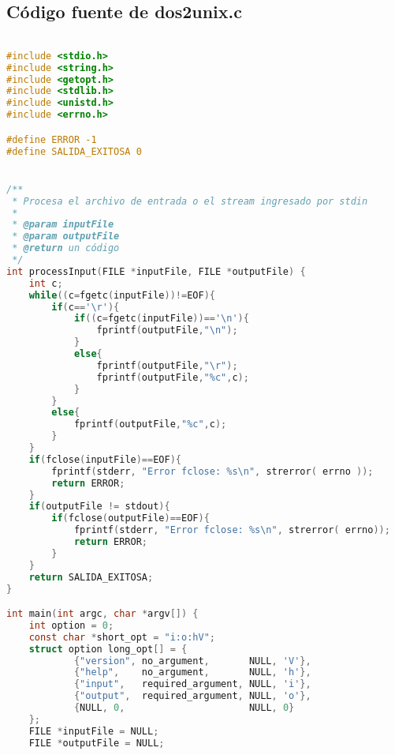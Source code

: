 \documentclass[a4paper]{article}
\begin{document}
\subsection{Código fuente de dos2unix.c}
\begin{lstlisting}[language=C]

#include <stdio.h>
#include <string.h>
#include <getopt.h>
#include <stdlib.h>
#include <unistd.h>
#include <errno.h>

#define ERROR -1
#define SALIDA_EXITOSA 0


/**
 * Procesa el archivo de entrada o el stream ingresado por stdin
 *
 * @param inputFile
 * @param outputFile
 * @return un código
 */
int processInput(FILE *inputFile, FILE *outputFile) {
    int c;
    while((c=fgetc(inputFile))!=EOF){
        if(c=='\r'){
        	if((c=fgetc(inputFile))=='\n'){
        		fprintf(outputFile,"\n");
        	}
        	else{
        		fprintf(outputFile,"\r");
        		fprintf(outputFile,"%c",c);
        	}
        }
        else{
            fprintf(outputFile,"%c",c);
        }
    }
    if(fclose(inputFile)==EOF){
        fprintf(stderr, "Error fclose: %s\n", strerror( errno ));
        return ERROR;
    }
    if(outputFile != stdout){
        if(fclose(outputFile)==EOF){
            fprintf(stderr, "Error fclose: %s\n", strerror( errno));
            return ERROR;
        }
    }
    return SALIDA_EXITOSA;
}

int main(int argc, char *argv[]) {
    int option = 0;
    const char *short_opt = "i:o:hV";
    struct option long_opt[] = {
            {"version", no_argument,       NULL, 'V'},
            {"help",    no_argument,       NULL, 'h'},
            {"input",   required_argument, NULL, 'i'},
            {"output",  required_argument, NULL, 'o'},
            {NULL, 0,                      NULL, 0}
    };
    FILE *inputFile = NULL;
    FILE *outputFile = NULL;


\end{lstlisting}
\end{document}
